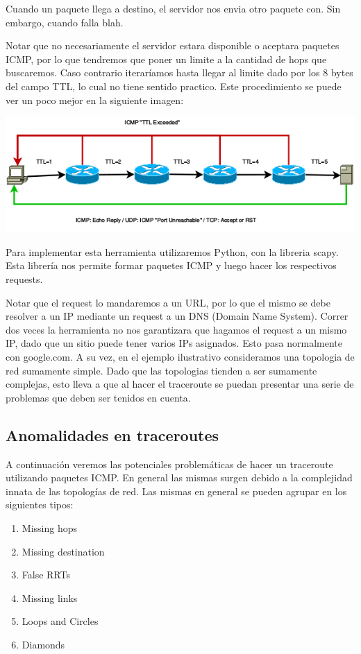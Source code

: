 Cuando un paquete llega a destino, el servidor nos envia otro paquete con. Sin embargo, cuando falla blah.


Notar que no necesariamente el servidor estara disponible o aceptara paquetes ICMP, por lo que tendremos que poner un limite a la cantidad de hops que buscaremos. Caso contrario iteraríamos hasta llegar al limite dado por los 8 bytes del campo TTL, lo cual no tiene sentido practico. Este procedimiento se puede ver un poco mejor en la siguiente imagen:

\includegraphics[width=\textwidth,keepaspectratio]{images/traceroute_typical}

Para implementar esta herramienta utilizaremos Python, con la libreria scapy. Esta librería nos permite formar paquetes ICMP y luego hacer los respectivos requests.

Notar que el request lo mandaremos a un URL, por lo que el mismo se debe resolver a un IP mediante un request a un DNS (Domain Name System). Correr dos veces la herramienta no nos garantizara que hagamos el request a un mismo IP, dado que un sitio puede tener varios IPs asignados. Esto pasa normalmente con google.com. A su vez, en el ejemplo ilustrativo consideramos una topologia de red sumamente simple. Dado que las topologias tienden a ser sumamente complejas, esto lleva a que al hacer el traceroute se puedan presentar una serie de problemas que deben ser tenidos en cuenta.

\subsection{Anomalidades en traceroutes}

A continuación veremos las potenciales problemáticas de hacer un traceroute utilizando paquetes ICMP. En general las mismas surgen debido a la complejidad innata de las topologías de red. Las mismas en general se pueden agrupar en los siguientes tipos:

\begin{enumerate}
	\item Missing hops
	\item Missing destination
	\item False RRTs
	\item Missing links
	\item Loops and Circles
	\item Diamonds
\end{enumerate}

